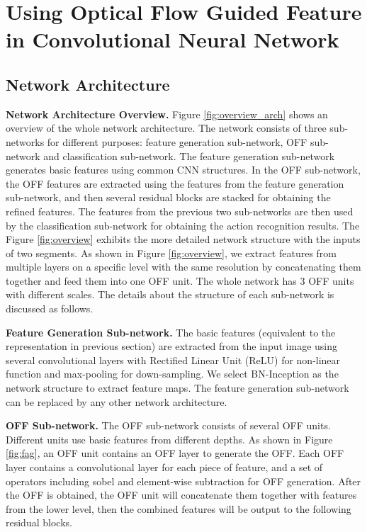 \documentclass[10pt,twocolumn,letterpaper]{article}
\begin{document}
\section{Using Optical Flow Guided Feature in Convolutional Neural Network}
\label{sec:cnn}



\subsection{Network Architecture}

 \textbf{Network Architecture Overview.} Figure \ref{fig:overview_arch} shows an overview of the whole network architecture. 
 The network consists of three sub-networks for different purposes: feature generation sub-network, OFF sub-network and classification sub-network. The feature generation sub-network generates basic features using common CNN structures. In the OFF sub-network, the OFF features are extracted using the features from the feature generation sub-network, and then several residual blocks are stacked for obtaining the refined features. The features from the previous two sub-networks are then used by the classification sub-network for obtaining the action recognition results. The Figure \ref{fig:overview} exhibits the more detailed network structure with the inputs of two segments. 
 As shown in Figure \ref{fig:overview}, we extract features from multiple layers on a specific level with the same resolution by concatenating them together and feed them into one OFF unit. The whole network has 3 OFF units with different scales. The details about the structure of each sub-network is discussed as follows.
 
 \vspace{-3px}
 \textbf{Feature Generation Sub-network.} The basic features  (equivalent to the representation  in previous section) are extracted from the input image using several convolutional layers with Rectified Linear Unit (ReLU) for non-linear function and max-pooling for down-sampling. We select BN-Inception  \cite{Szegedycvpr2015googlenet} as the network structure to extract feature maps. The feature generation sub-network can be replaced by any other network architecture.

  \textbf{OFF Sub-network.} The OFF sub-network consists of several OFF units. Different units use basic features  from different depths. As shown in Figure \ref{fig:fag}, an OFF unit contains an OFF layer to generate the OFF. Each OFF layer contains a  convolutional layer for each piece of feature, and a set of operators including sobel and element-wise subtraction for OFF generation. After the OFF is obtained, the OFF unit will concatenate them together with features from the lower level, then the combined features will be output to the following residual blocks.
 
\end{document}
